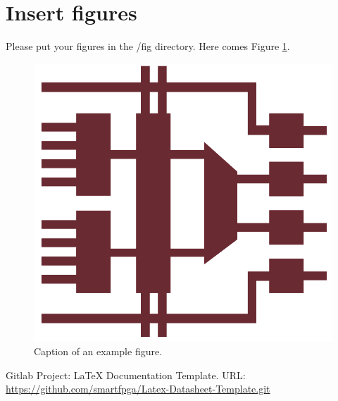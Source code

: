 \documentclass[a4paper, 10pt, onecolumn]{article}
\begin{document}
\section*{Insert figures}
Please put your figures in the /fig directory. Here comes Figure \ref{fig:FigureRef}.
\begin{figure}[H]
    \begin{center}
        \includegraphics[width=14cm]{fig/SampleFigure.png}
    \end{center}
    \caption{Caption of an example figure.}
    \label{fig:FigureRef}
\end{figure}



\begin{thebibliography}{3}
Gitlab Project: LaTeX Documentation Template. URL:\\
\url{https://github.com/smartfpga/Latex-Datasheet-Template.git}
\end{thebibliography}
\end{document}
